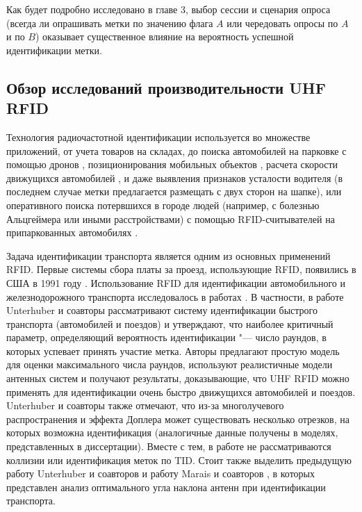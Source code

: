 Как будет подробно исследовано в главе 3, выбор сессии и сценария опроса (всегда ли опрашивать метки по значению флага $A$ или чередовать опросы по $A$ и по $B$) оказывает существенное влияние на вероятность успешной идентификации метки.



\subsection{Обзор исследований производительности UHF RFID}\label{sec:ch1_rfid_observe}

Технология радиочастотной идентификации \cite{Finkenzeller2010, Dobkin2008} используется во множестве приложений, от учета товаров на складах, до поиска автомобилей на парковке с помощью дронов \cite{Wu2019}, позиционирования мобильных объектов \cite{Cho2013, Park2013, Errington2010}, расчета скорости движущихся автомобилей \cite{Zhai2018, Choy2020, Jing2013}, и даже выявления признаков усталости водителя \cite{Yang2020} (в последнем случае метки предлагается размещать с двух сторон на шапке), или оперативного поиска потервшихся в городе людей (например, с болезнью Альцгеймера или иными расстройствами) с помощью RFID-считывателей на припаркованных автомобилях \cite{Griggs2018}.

Задача идентификации транспорта является одним из основных применений RFID. Первые системы сбора платы за проезд, использующие RFID, появились в США в 1991 году \cite{Landt2005}. Использование RFID для идентификации автомобильного и железнодорожного транспорта исследовалось в работах \cite{Gonzalez2013, Blythe1999, Khan2011, Yoon2008, Al-Naima2011, Tseng2007, Kostrominov2020, Unterhuber2019, Unterhuber2020, Unterhuber2019, Pawowicz2020, Choy2020, Jo2009, Zhang2010, MenesesGonzalez2011, Lonkar2018, Balbin2017, Bhavke2017, Zhang2011, Zhang2010a, Pandit2009, Sundar2015}. В частности, в работе \cite{Unterhuber2020} Unterhuber и соавторы рассматривают систему идентификации быстрого транспорта (автомобилей и поездов) и утверждают, что наиболее критичный параметр, определяющий вероятность идентификации "--- число раундов, в которых успевает принять участие метка. Авторы предлагают простую модель для оценки максимального числа раундов, используют реалистичные модели антенных систем и получают результаты, доказывающие, что UHF RFID можно применять для идентификации очень быстро движущихся автомобилей и поездов. Unterhuber и соавторы также отмечают, что из-за многолучевого распространения и эффекта Доплера может существовать несколько отрезков, на которых возможна идентификация (аналогичные данные получены в моделях, представленных в диссертации). Вместе с тем, в работе \cite{Unterhuber2020} не рассматриваются коллизии или идентификация меток по TID. Стоит также выделить предыдущую работу Unterhuber и соавторов \cite{Unterhuber2019} и работу Marais и соавторов \cite{Marais2013}, в которых представлен анализ оптимального угла наклона антенн при идентификации транспорта.


